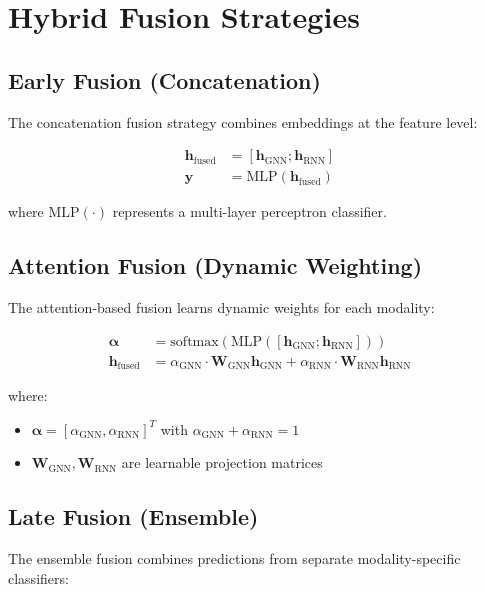 \documentclass[12pt]{article}
\newcommand{\vecbf}[1]{\mathbf{#1}}
\newcommand{\softmax}{\text{softmax}}
\begin{document}
\section{Hybrid Fusion Strategies}

\subsection{Early Fusion (Concatenation)}

The concatenation fusion strategy combines embeddings at the feature level:

\begin{align}
\vecbf{h}_{\text{fused}} &= [\vecbf{h}_{\text{GNN}}; \vecbf{h}_{\text{RNN}}] \\
\vecbf{y} &= \text{MLP}(\vecbf{h}_{\text{fused}})
\end{align}

where $\text{MLP}(\cdot)$ represents a multi-layer perceptron classifier.

\subsection{Attention Fusion (Dynamic Weighting)}

The attention-based fusion learns dynamic weights for each modality:

\begin{align}
\boldsymbol{\alpha} &= \softmax(\text{MLP}([\vecbf{h}_{\text{GNN}}; \vecbf{h}_{\text{RNN}}])) \\
\vecbf{h}_{\text{fused}} &= \alpha_{\text{GNN}} \cdot \vecbf{W}_{\text{GNN}} \vecbf{h}_{\text{GNN}} + \alpha_{\text{RNN}} \cdot \vecbf{W}_{\text{RNN}} \vecbf{h}_{\text{RNN}}
\end{align}

where:
\begin{itemize}
    \item $\boldsymbol{\alpha} = [\alpha_{\text{GNN}}, \alpha_{\text{RNN}}]^T$ with $\alpha_{\text{GNN}} + \alpha_{\text{RNN}} = 1$
    \item $\vecbf{W}_{\text{GNN}}, \vecbf{W}_{\text{RNN}}$ are learnable projection matrices
\end{itemize}

\subsection{Late Fusion (Ensemble)}

The ensemble fusion combines predictions from separate modality-specific classifiers:
\end{document}
